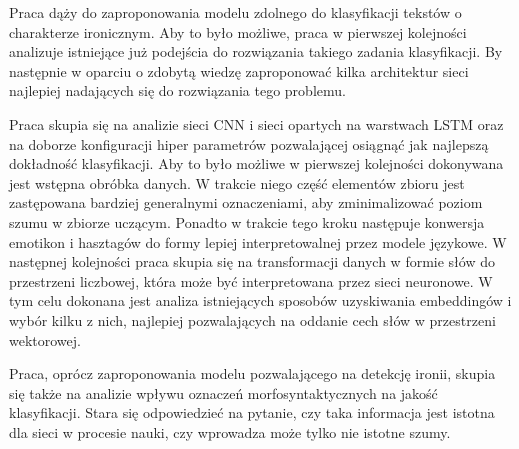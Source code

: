 
Praca dąży do zaproponowania modelu zdolnego do klasyfikacji tekstów o charakterze ironicznym. Aby to było możliwe, praca w pierwszej kolejności analizuje istniejące już podejścia do rozwiązania takiego zadania klasyfikacji. By następnie w oparciu o zdobytą wiedzę zaproponować kilka architektur sieci najlepiej nadających się do rozwiązania tego problemu. 

Praca skupia się na analizie sieci CNN i sieci opartych na warstwach LSTM oraz na doborze konfiguracji hiper parametrów pozwalającej osiągnąć jak najlepszą dokładność klasyfikacji. Aby to było możliwe w pierwszej kolejności dokonywana jest wstępna obróbka danych. W trakcie niego część elementów zbioru jest zastępowana bardziej generalnymi oznaczeniami, aby zminimalizować poziom szumu w zbiorze uczącym. Ponadto w trakcie tego kroku następuje konwersja emotikon i hasztagów do formy lepiej interpretowalnej przez modele językowe. W następnej kolejności praca skupia się na transformacji danych w formie słów do przestrzeni liczbowej, która może być interpretowana przez sieci neuronowe. W tym celu dokonana jest analiza istniejących sposobów uzyskiwania embeddingów i wybór kilku z nich, najlepiej pozwalających na oddanie cech słów w przestrzeni wektorowej. 

Praca, oprócz zaproponowania modelu pozwalającego na detekcję ironii, skupia się także na analizie wpływu oznaczeń morfosyntaktycznych na jakość klasyfikacji. Stara się odpowiedzieć na pytanie, czy taka informacja jest istotna dla sieci w procesie nauki, czy wprowadza może tylko nie istotne szumy. 



